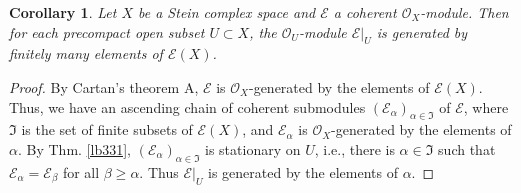 \documentclass[12pt,b5paper,notitlepage]{report}
\theoremstyle{definition}
\theoremstyle{plain}
\newtheorem{co}[df]{Corollary}
\newcommand{\fk}{\mathfrak}
\newcommand{\scr}{\mathscr}
\numberwithin{equation}{section}
\begin{document}
\begin{co}\label{lb405}
Let $X$ be a Stein complex space and $\scr E$ a coherent $\scr O_X$-module. Then for each precompact open subset $U\subset X$, the $\scr O_U$-module $\scr E|_U$ is generated by finitely many elements of $\scr E(X)$.
\end{co}


\begin{proof}
By Cartan's theorem A, $\scr E$ is $\scr O_X$-generated by the elements of $\scr E(X)$. Thus, we have an ascending chain of coherent submodules $(\scr E_\alpha)_{\alpha\in\fk I}$ of $\scr E$, where $\fk I$ is the set of finite subsets of $\scr E(X)$, and $\scr E_\alpha$ is $\scr O_X$-generated by the elements of $\alpha$. By Thm. \ref{lb331}, $(\scr E_\alpha)_{\alpha\in\fk I}$ is stationary on $U$, i.e., there is $\alpha\in\fk I$ such that $\scr E_\alpha=\scr E_\beta$ for all $\beta\geq\alpha$. Thus $\scr E|_U$ is generated by the elements of $\alpha$.
\end{proof}
\end{document}
